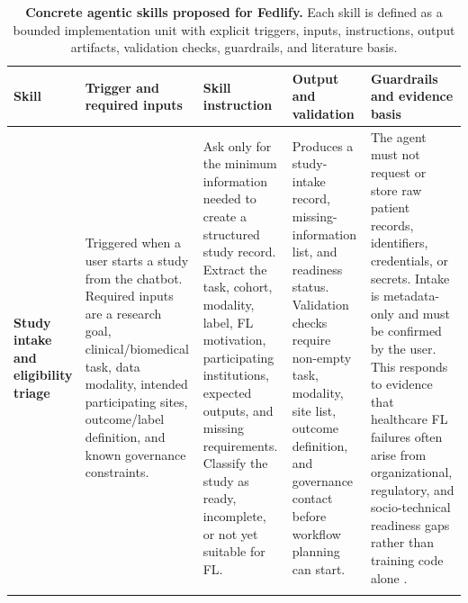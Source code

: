 \documentclass[preprint,5p, 10pt, times]{elsarticle}
\begin{document}
\begin{table}[t]
\centering
\caption{\textbf{Concrete agentic skills proposed for Fedlify.} Each skill is defined as a bounded implementation unit with explicit triggers, inputs, instructions, output artifacts, validation checks, guardrails, and literature basis.}
\label{tab:fedlify_agentic_framework}
\tiny
\setlength{\tabcolsep}{2.5pt}
\renewcommand{\arraystretch}{1.18}
\begin{tabularx}{\textwidth}{
>{\raggedright\arraybackslash}p{2.4cm}
>{\raggedright\arraybackslash}p{2.7cm}
>{\raggedright\arraybackslash}X
>{\raggedright\arraybackslash}X
>{\raggedright\arraybackslash}X}
\toprule
\textbf{Skill} & \textbf{Trigger and required inputs} & \textbf{Skill instruction} & \textbf{Output and validation} & \textbf{Guardrails and evidence basis} \\
\midrule

\textbf{Study intake and eligibility triage}
& Triggered when a user starts a study from the chatbot. Required inputs are a research goal, clinical/biomedical task, data modality, intended participating sites, outcome/label definition, and known governance constraints.
& Ask only for the minimum information needed to create a structured study record. Extract the task, cohort, modality, label, FL motivation, participating institutions, expected outputs, and missing requirements. Classify the study as ready, incomplete, or not yet suitable for FL.
& Produces a study-intake record, missing-information list, and readiness status. Validation checks require non-empty task, modality, site list, outcome definition, and governance contact before workflow planning can start.
& The agent must not request or store raw patient records, identifiers, credentials, or secrets. Intake is metadata-only and must be confirmed by the user. This responds to evidence that healthcare FL failures often arise from organizational, regulatory, and socio-technical readiness gaps rather than training code alone \cite{schoenpflug2025navigating,peltonen2026federated,eden2025scoping}. \\
\addlinespace[3pt]


\end{tabularx}
\end{table}
\end{document}
